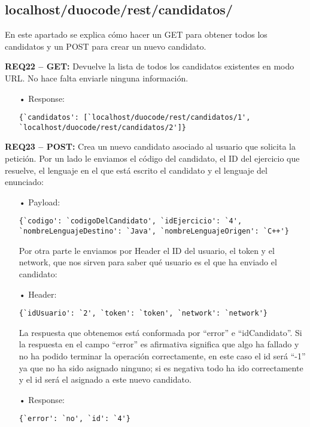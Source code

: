 \subsection{localhost/duocode/rest/candidatos/}
En este apartado se explica cómo hacer un GET para obtener todos los candidatos y un POST para crear un nuevo candidato.
\vspace{1em}

\textbf{REQ22 – GET:} Devuelve la lista de todos los candidatos existentes en modo URL. No hace falta enviarle ninguna información. 

\begin{itemize}
\item[•]
Response: 
{\codesize
\begin{verbatim}
{`candidatos': [`localhost/duocode/rest/candidatos/1', 
`localhost/duocode/rest/candidatos/2']}
\end{verbatim}
}
\end{itemize}

\textbf{REQ23 – POST:} Crea un nuevo candidato asociado al usuario que solicita la petición. Por un lado le enviamos el código del candidato, el ID del ejercicio que resuelve, el lenguaje en el que está escrito el candidato y el lenguaje del enunciado:
\begin{itemize}
\item[•]
Payload: 
{\codesize
\begin{verbatim}
{`codigo': `codigoDelCandidato', `idEjercicio': `4', 
`nombreLenguajeDestino': `Java', `nombreLenguajeOrigen': `C++'}
\end{verbatim}
}

Por otra parte le enviamos por Header el ID del usuario, el token y el network, que nos sirven para saber qué usuario es el que ha enviado el candidato:
\item[•]
Header: 
{\codesize
\begin{verbatim}
{`idUsuario': `2', `token': `token', `network': `network'}
\end{verbatim}
}
La respuesta que obtenemos está conformada por ``error'' e ``idCandidato''. Si la respuesta en el campo ``error'' es afirmativa significa que algo ha fallado y no ha podido terminar la operación correctamente, en este caso el id será ``-1'' ya que no ha sido asignado ninguno; si es negativa todo ha ido correctamente y el id será el asignado a este nuevo candidato. 
\item[•]
Response: 
{\codesize
\begin{verbatim}
{`error': `no', `id': `4'}
\end{verbatim}
}
\end{itemize}

